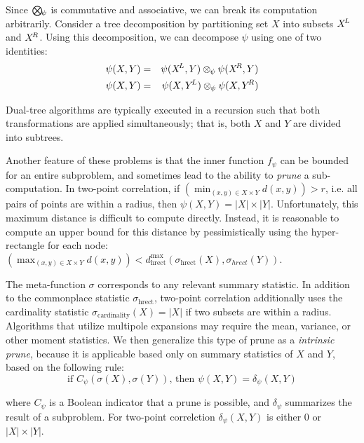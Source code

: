\documentclass[times, 10pt,twocolumn]{article}
\DeclareMathOperator{\cardinality}{cardinality}
\DeclareMathOperator{\hrect}{hrect}
\newcommand{\kdleft}{\hspace{-0.02in}^L}
\newcommand{\kdright}{\hspace{-0.02in}^R}
\newcommand{\myOp}[1]{\mathop{\bigotimes\nolimits\hspace{-0.045in}_{#1}}}
\newcommand{\myop}[1]{\otimes\hspace{-0.04in}_{#1}\hspace{0.03in}}
\newcommand{\allpsi}{\psi}
\newcommand{\Oppsi}{\myOp{\psi}}
\newcommand{\oppsi}{\myop{\psi}}
\newcommand{\fpsi}{f_{\psi}}
\newcommand{\canprunepsi}{C_{\psi}}
\newcommand{\deltapsi}{\delta_{\psi}}
\newcommand{\allsigma}{\sigma}
\begin{document}

Since $\Oppsi$ is commutative and associative, we can break its computation arbitrarily.
Consider a tree decomposition by partitioning set $X$ into subsets $X\kdleft$ and $X\kdright$.
Using this decomposition, we can decompose $\allpsi$ using one of two identities:
\begin{eqnarray}
\allpsi(X, Y) &=& \allpsi(X\kdleft, Y) \oppsi \allpsi(X\kdright, Y)
\\
\allpsi(X, Y) &=& \allpsi(X, Y\kdleft) \oppsi \allpsi(X, Y\kdright)
\label{eqn:dividepsi}
\end{eqnarray}

Dual-tree algorithms are typically executed in a recursion such that both transformations are applied simultaneously; that is, both $X$ and $Y$ are divided into subtrees.

Another feature of these problems is that the inner function $\fpsi$ can be bounded for an entire subproblem, and sometimes lead to the ability to {\it prune} a sub-computation.
In two-point correlation, if $\left(\min_{(x, y) \in X \times Y} d(x, y)\right) > r$, i.e. all pairs of points are within a radius, then $\allpsi(X, Y) = |X| \times |Y|$.
Unfortunately, this maximum distance is difficult to compute directly.
Instead, it is reasonable to compute an upper bound for this distance by pessimistically using the hyper-rectangle for each node: $\left(\max_{(x, y) \in X \times Y} d(x, y)\right) < d^{\max}_{\hrect}(\allsigma_{\hrect}(X), \allsigma_{hrect}(Y))$.

The meta-function $\allsigma$ corresponds to any relevant summary statistic.
In addition to the commonplace statistic $\allsigma_{\hrect}$, two-point correlation additionally uses the cardinality statistic $\allsigma_{\cardinality}(X) = |X|$ if two subsets are within a radius.
Algorithms that utilize multipole expansions may require the mean, variance, or other moment statistics.
We then generalize this type of prune as a {\it intrinsic prune}, because it is applicable based only on summary statistics of $X$ and $Y$, based on the following rule:
\begin{equation}
\text{if } \canprunepsi(\allsigma(X), \allsigma(Y)) \text{, then } \allpsi(X, Y) = \deltapsi(X, Y)
\label{eqn:intrinsic}
\end{equation}

\noindent where $\canprunepsi$ is a Boolean indicator that a prune is possible, and $\deltapsi$ summarizes the result of a subproblem.
For two-point correlction $\deltapsi(X, Y)$ is either $0$ or $|X| \times |Y|$.
\end{document}
